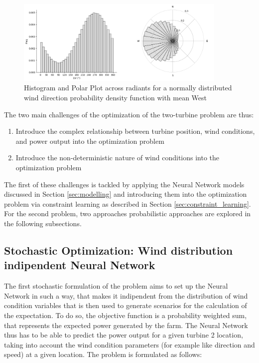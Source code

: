 \documentclass[preprint,12pt]{elsarticle}
\begin{document}
\begin{figure}[h] 
	\centering
	\includegraphics[width=0.9\textwidth]{../figures/optimization/wind_dist.png} %
	\caption{Histogram and Polar Plot across radiants for a normally distributed wind direction probability density function with mean West}
	\label{fig:wind_dist}
\end{figure}

The two main challenges of the optimization of the two-turbine problem are thus: 

\begin{enumerate}
	\item Introduce the complex relationship between turbine position, wind conditions, and power output into the optimization problem
	\item Introduce the non-deterministic nature of wind conditions into the optimization problem
\end{enumerate}

The first of these challenges is tackled by applying the Neural Network models discussed in Section \ref{sec:modelling} and introducing them into the optimization problem via constraint learning as described in Section \ref{sec:constraint_learning}. For the second problem, two approaches probabilistic approaches are explored in the following subsections.

\subsection{Stochastic Optimization: Wind distribution indipendent Neural Network} \label{sec:stoch_opti_1}

The first stochastic formulation of the problem aims to set up the Neural Network in such a way, that makes it indipendent from the distribution of wind condition variables that is then used to generate scenarios for the calculation of the expectation. To do so, the objective function is a probability weighted sum, that represents the expected power generated by the farm. The Neural Network thus  has to be able to predict the power output for a given turbine 2 location, taking into account the wind condition parameters (for example like direction and speed) at a given location. The problem is formulated as follows: 
\end{document}
